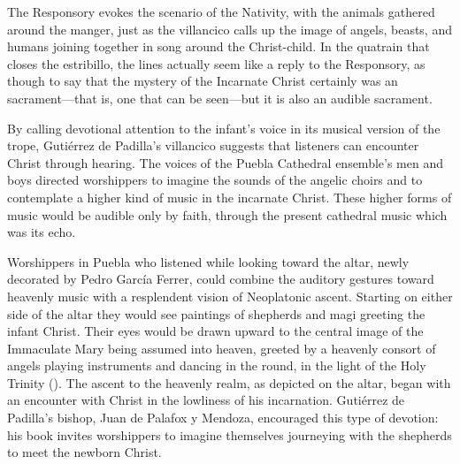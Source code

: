 The Responsory evokes the scenario of the Nativity, with the animals gathered
around the manger, just as the villancico calls up the image of angels, beasts,
and humans joining together in song around the Christ-child.
In the quatrain that closes the estribillo, the lines  actually seem like a reply to the Responsory,
as though to say that the mystery of the Incarnate Christ certainly was an
 sacrament---that is, one that can be seen---but it is also
an audible sacrament.


By calling devotional attention to the infant's voice in its musical version of
the  trope, Gutiérrez de Padilla's villancico suggests that
listeners can encounter Christ through hearing.
The voices of the Puebla Cathedral ensemble's men and boys directed worshippers
to imagine the sounds of the angelic choirs and to contemplate a higher kind of
music in the incarnate Christ.
These higher forms of music would be audible only by faith, through the present
cathedral music which was its echo.

Worshippers in Puebla who listened while looking toward the altar, newly
decorated by Pedro García Ferrer, could combine the auditory gestures toward
heavenly music with a resplendent vision of Neoplatonic ascent.%
    \Autocites
    {Merlo:PueblaCat}
    {Gali:GarciaFerrer}
Starting on either side of the altar they would see paintings of shepherds and
magi greeting the infant Christ.
Their eyes would be drawn upward to the central image of the Immaculate Mary
being assumed into heaven, greeted by a heavenly consort of angels playing
instruments and dancing in the round, in the light of the Holy Trinity
().%
   \Autocite[The complex is in part a visual embodiment of musical encomium:][]
   {Schmidt:Lob_der_Musik}
The ascent to the heavenly realm, as depicted on the altar, began with an
encounter with Christ in the lowliness of his incarnation. 
Gutiérrez de Padilla's bishop, Juan de  Palafox y Mendoza, encouraged this type
of devotion: his book  invites worshippers to
imagine themselves journeying with the shepherds to meet the newborn Christ.%
    \Autocite{Palafox:Nochebuena}


